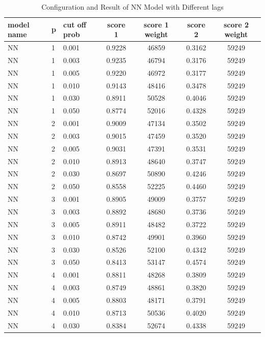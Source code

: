 \documentclass{article}
\begin{document}
\begin{longtable}[htbp]{l|l|l|*{4}{c}}
  \caption{Configuration and Result of NN Model with Different lags}
  \label{tab:tab1.3.7} \\
  \textbf{model name} & \textbf{p} & \textbf{cut off prob} & \textbf{score 1} &
  \textbf{score 1 weight} & \textbf{score 2} & \textbf{score 2 weight} \\
      \hline
      NN & 1 & 0.001 & 0.9228 & 46859 & 0.3162 & 59249\\
      NN & 1 & 0.003 & 0.9235 & 46794 & 0.3176 & 59249\\
      NN & 1 & 0.005 & 0.9220 & 46972 & 0.3177 & 59249\\
      NN & 1 & 0.010 & 0.9143 & 48416 & 0.3478 & 59249\\
      NN & 1 & 0.030 & 0.8911 & 50528 & 0.4046 & 59249\\
      NN & 1 & 0.050 & 0.8774 & 52016 & 0.4328 & 59249\\
      NN & 2 & 0.001 & 0.9009 & 47134 & 0.3502 & 59249\\
      NN & 2 & 0.003 & 0.9015 & 47459 & 0.3520 & 59249\\
      NN & 2 & 0.005 & 0.9031 & 47391 & 0.3531 & 59249\\
      NN & 2 & 0.010 & 0.8913 & 48640 & 0.3747 & 59249\\
      NN & 2 & 0.030 & 0.8697 & 50890 & 0.4246 & 59249\\
      NN & 2 & 0.050 & 0.8558 & 52225 & 0.4460 & 59249\\
      NN & 3 & 0.001 & 0.8905 & 49009 & 0.3757 & 59249\\
      NN & 3 & 0.003 & 0.8892 & 48680 & 0.3736 & 59249\\
      NN & 3 & 0.005 & 0.8911 & 48482 & 0.3722 & 59249\\
      NN & 3 & 0.010 & 0.8742 & 49901 & 0.3960 & 59249\\
      NN & 3 & 0.030 & 0.8526 & 52100 & 0.4342 & 59249\\
      NN & 3 & 0.050 & 0.8413 & 53147 & 0.4574 & 59249\\
      NN & 4 & 0.001 & 0.8811 & 48268 & 0.3809 & 59249\\
      NN & 4 & 0.003 & 0.8749 & 48861 & 0.3820 & 59249\\
      NN & 4 & 0.005 & 0.8803 & 48171 & 0.3791 & 59249\\
      NN & 4 & 0.010 & 0.8713 & 50536 & 0.4020 & 59249\\
      NN & 4 & 0.030 & 0.8384 & 52674 & 0.4338 & 59249\\

\end{longtable}
\end{document}
